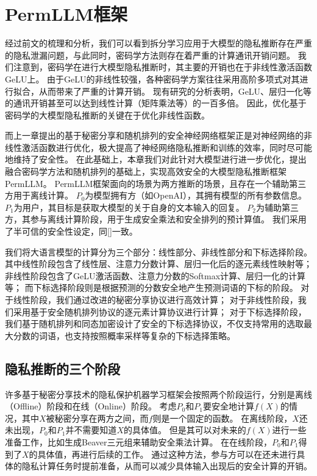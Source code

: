 \section{PermLLM框架}
经过前文的梳理和分析，我们可以看到拆分学习应用于大模型的隐私推断存在严重的隐私泄漏问题，与此同时，密码学方法则存在着严重的计算通讯开销问题。
%
我们注意到，密码学在进行大模型隐私推断时，其主要的开销也在于非线性激活函数GeLU上。
由于GeLU的非线性较强，各种密码学方案往往采用高阶多项式对其进行拟合，从而带来了严重的计算开销。
%
现有研究的分析表明，GeLU、层归一化等的通讯开销甚至可以达到线性计算（矩阵乘法等）的一百多倍。
%
因此，优化基于密码学的大模型隐私推断的关键在于优化非线性函数。
%
%

而上一章提出的基于秘密分享和随机排列的安全神经网络框架正是对神经网络的非线性激活函数进行优化，极大提高了神经网络隐私推断和训练的效率，同时尽可能地维持了安全性。
%
在此基础上，本章我们对此针对大模型进行进一步优化，提出融合密码学方法和随机排列的基础上，实现高效安全的大模型隐私推断框架PermLLM。
%
PermLLM框架面向的场景为两方推断的场景，且存在一个辅助第三方用于离线计算。
%
$P_0$为模型拥有方（如OpenAI），其拥有模型的所有参数信息。
%
$P_1$为用户，其目标是获取大模型的关于自身的文本输入的回复。
%
$P_2$为辅助第三方，其参与离线计算阶段，用于生成安全乘法和安全排列的预计算值。
%
我们采用了半可信的安全性设定，同\autoref{}一致。


我们将大语言模型的计算分为三个部分：线性部分、非线性部分和下标选择阶段。
其中线性阶段包含了线性层、注意力分数计算、层归一化后的逐元素线性映射等；
非线性阶段包含了GeLU激活函数、注意力分数的Softmax计算、层归一化的计算等；
而下标选择阶段则是根据预测的分数安全地产生预测词语的下标的阶段。
%
对于线性阶段，我们通过改进的秘密分享协议进行高效计算；
对于非线性阶段，我们采用基于安全随机排列协议的逐元素计算协议进行计算；
对于下标选择阶段，我们基于随机排列和同态加密设计了安全的下标选择协议，不仅支持常用的选取最大分数的词语，也支持按照概率采样等复杂的下标选择策略。
%


\subsection{隐私推断的三个阶段}
许多基于秘密分享技术的隐私保护机器学习框架会按照两个阶段运行，分别是离线（Offline）阶段和在线（Online）阶段。
%
考虑$P_0$和$P_1$要安全地计算$f(X)$的情况，其中$X$被秘密分享在两方之间，而$f$则是一个固定的函数。
%
在离线阶段，$X$还未出现，$P_0$和$P_1$并不需要知道$X$的具体值。
%
但是其可以对未来的$f(X)$进行一些准备工作，比如生成Beaver三元组来辅助安全乘法计算。
%
在在线阶段，$P_0$和$P_1$得到了$X$的具体值，再进行后续的工作。
通过这种方法，参与方可以在还未进行具体的隐私计算任务时提前准备，从而可以减少具体输入出现后的安全计算的开销。

